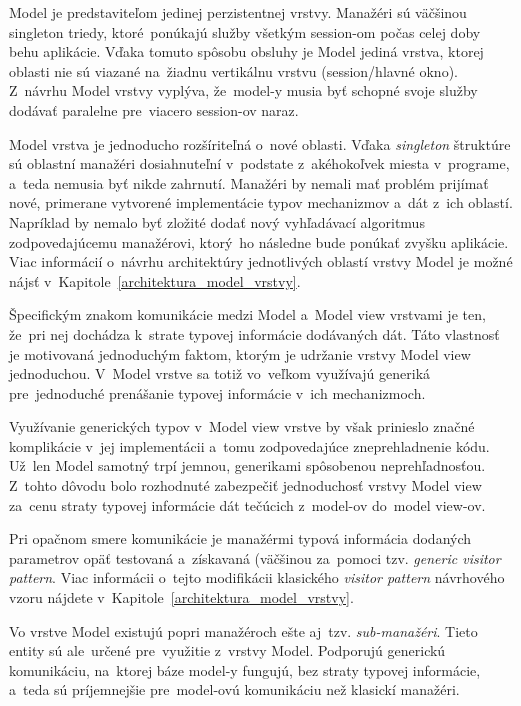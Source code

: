 Model je predstaviteľom jedinej perzistentnej  vrstvy. Manažéri sú väčšinou singleton triedy, ktoré~ponúkajú služby všetkým session-om počas celej doby behu aplikácie. Vďaka tomuto spôsobu obsluhy je Model jediná vrstva, ktorej oblasti nie sú viazané na~žiadnu vertikálnu vrstvu (session/hlavné okno). Z~návrhu Model vrstvy vyplýva, že~model-y musia byť schopné svoje služby dodávať paralelne pre~viacero session-ov naraz. 

Model vrstva je jednoducho rozšíriteľná o~nové oblasti. Vďaka \textit{singleton} štruktúre sú oblastní manažéri dosiahnuteľní v~podstate z~akéhokoľvek miesta v~programe, a~teda nemusia byť nikde zahrnutí. Manažéri by nemali mať problém prijímať nové, primerane vytvorené implementácie typov mechanizmov a~dát z~ich oblastí. Napríklad by nemalo byť zložité dodať nový vyhľadávací algoritmus zodpovedajúcemu manažérovi, ktorý~ho následne bude ponúkať zvyšku aplikácie. Viac informácií o~návrhu architektúry jednotlivých oblastí vrstvy Model je možné nájsť v~Kapitole~\ref{architektura_model_vrstvy}.

Špecifickým znakom komunikácie medzi Model a~Model view vrstvami je ten, že~pri nej dochádza k~strate typovej informácie dodávaných dát. Táto vlastnosť je motivovaná jednoduchým faktom, ktorým je udržanie vrstvy Model view jednoduchou. V~Model vrstve sa totiž vo~veľkom využívajú generiká pre~jednoduché prenášanie typovej informácie v~ich mechanizmoch. 

Využívanie generických typov v~Model view vrstve by však prinieslo značné komplikácie v~jej implementácii a~tomu zodpovedajúce zneprehladnenie kódu. Už~len Model samotný trpí jemnou, generikami spôsobenou neprehľadnosťou. Z~tohto dôvodu bolo rozhodnuté zabezpečiť jednoduchosť vrstvy Model view za~cenu straty typovej informácie dát tečúcich z~model-ov do~model view-ov. 

Pri opačnom smere komunikácie je manažérmi typová informácia dodaných parametrov opäť testovaná a~získavaná (väčšinou za~pomoci tzv. \textit{generic visitor pattern}. Viac informácii o~tejto modifikácii klasického \textit{visitor pattern} návrhového vzoru nájdete v~Kapitole~\ref{architektura_model_vrstvy}.

Vo vrstve Model existujú popri manažéroch ešte aj~tzv. \textit{sub-manažéri}. Tieto entity sú ale~určené pre~využitie z~vrstvy Model. Podporujú generickú komunikáciu, na~ktorej báze model-y fungujú, bez straty typovej informácie, a~teda sú príjemnejšie pre~model-ovú komunikáciu než klasickí manažéri.     

